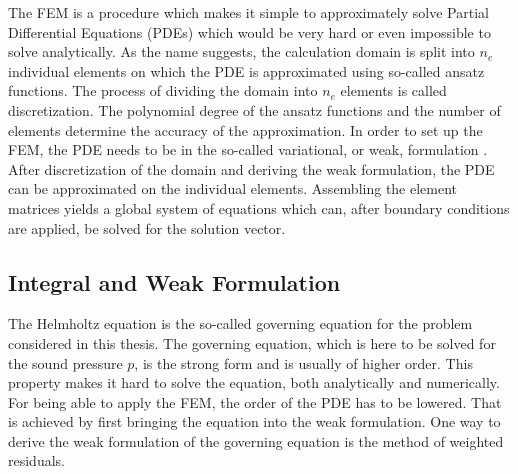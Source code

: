 \documentclass[%
  a4paper,oneside,%
  11pt,%
  smallchapters,
  style=printdev,
  extramargin,
  green,%
  rgb, <cmyk>
  ]{tubsbook}
\begin{document}
The FEM is a procedure which makes it simple to approximately solve Partial Differential Equations (PDEs) which would be very hard or even impossible to solve analytically. As the name suggests, the calculation domain is split into $n_e$ individual elements on which the PDE is approximated using so-called ansatz functions. The process of dividing the domain into $n_e$ elements is called discretization. The polynomial degree of the ansatz functions and the number of elements determine the accuracy of the approximation. In order to set up the FEM, the PDE needs to be in the so-called variational, or weak, formulation \cite{Lanczos1986}. 
After discretization of the domain and deriving the weak formulation, the PDE can be approximated on the individual elements. Assembling the element matrices yields a global system of equations which can, after boundary conditions are applied, be solved for the solution vector.


\subsection{Integral and Weak Formulation}
\label{sec:HelmholtzFormulations}
The Helmholtz equation is the so-called governing equation for the problem considered in this thesis. The governing equation, which is here to be solved for the sound pressure $p$, is the strong form and is usually of higher order. This property makes it hard to solve the equation, both analytically and numerically. For being able to apply the FEM, the order of the PDE has to be lowered. That is achieved by first bringing the equation into the weak formulation. 
One way to derive the weak formulation of the governing equation is the method of weighted residuals. 
\end{document}
